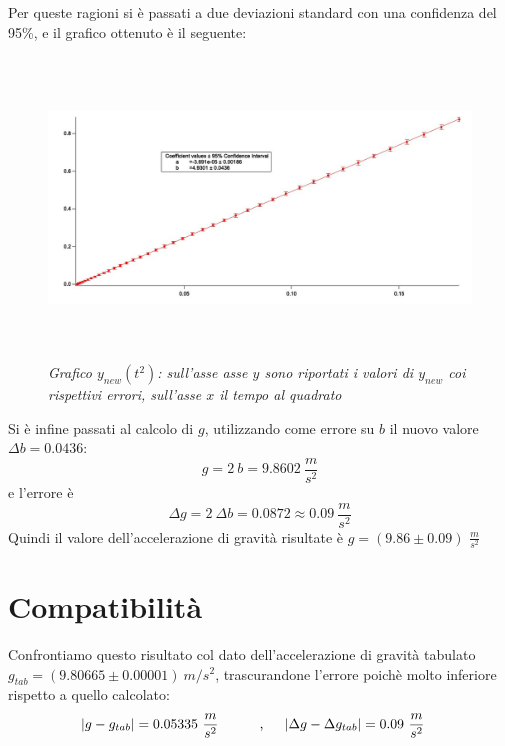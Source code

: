 \documentclass[12pt, a4paper]{article}
\begin{document}
\addvspace{1.5cm}
Per queste ragioni si è passati a due deviazioni standard con una confidenza del 95\%, e il grafico ottenuto è il seguente:
  \begin{figure}[h!]
\centering
\includegraphics[width=170mm, height=80mm]{Immagini/Graphy_t^2.jpg}
\caption{\textit{{\footnotesize{Grafico $y_{new}(t^2)$: sull'asse asse $y$ sono riportati i valori di $y_{new}$ coi rispettivi errori, sull'asse $x$ il tempo al quadrato}}}}
\label{Grafico compatibile y(t^2)}
\end{figure}


\newpage


Si è infine passati al calcolo di $g$, utilizzando come errore su $b$ il nuovo valore $\Delta b=0.0436$:
\begin{equation*}
    g=2 \ b=9.8602\ \frac{m}{s^2}
\end{equation*}
e l'errore è
\begin{equation*}
    \Delta g=2\ \Delta b=0.0872\approx 0.09\ \frac{m}{s^2}
\end{equation*}
Quindi il valore dell'accelerazione di gravità risultate è $g=(9.86\pm0.09)$ $\frac{m}{s^2}$
\section{Compatibilità}
Confrontiamo questo risultato col dato dell'accelerazione di gravità tabulato $g_{tab}=(9.80665\pm 0.00001)\ m/s^2$, trascurandone l'errore poichè molto inferiore rispetto a quello calcolato:
\begin{equation*}
\begin{aligned}
  & |g-g_{tab}|=0.05335 \ \frac{m}{s^2}
  &\quad{} 
  \end{aligned}
  \begin{aligned}
  &&\text{,\phantom{..}}& & 
  |\Delta g-\Delta g_{tab}|=0.09\ \frac{m}{s^2}
  &
  \end{aligned}
\end{equation*}
\end{document}
